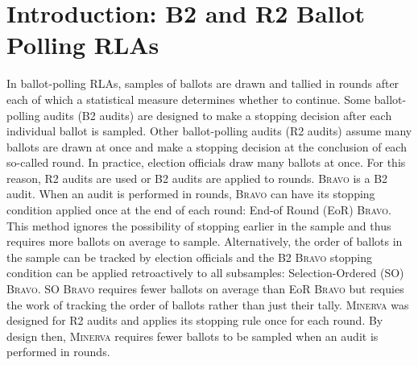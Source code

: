 \documentclass[runningheads]{llncs}
\newcommand{\Minerva}{\textsc{Minerva}\xspace}
\newcommand{\BRAVO}{\textsc{Bravo}\xspace}
\begin{document}
\section{Introduction: B2 and R2 Ballot Polling RLAs}
In ballot-polling RLAs, samples of ballots are drawn and tallied
in rounds
after each of which a statistical measure determines whether to
continue. 
Some ballot-polling audits (B2 audits) 
are designed to make a stopping decision
after each individual ballot is sampled.
Other ballot-polling audits (R2 audits) assume many ballots are drawn
at once and make a stopping decision at the conclusion of each 
so-called round.
In practice, election officials draw many ballots at once.
For this reason, R2 audits are used or B2 audits are applied to 
rounds.
\BRAVO is a B2 audit. 
When an audit is performed in rounds, \BRAVO can have its
stopping condition applied once at the end of each round: End-of Round (EoR) \BRAVO.
This method ignores the possibility of stopping earlier in the 
sample and thus requires more ballots on average to sample.
Alternatively, the order of ballots in the sample can be tracked
by election officials and the B2 \BRAVO stopping condition can 
be applied retroactively to all subsamples: Selection-Ordered (SO) \BRAVO.
SO \BRAVO requires fewer ballots on average than EoR \BRAVO but
requies the work of tracking the order of ballots rather than
just their tally.
\Minerva was designed for R2 audits and applies its stopping rule
once for each round.
By design then, \Minerva requires fewer ballots to be sampled when 
an audit is performed in rounds.
\end{document}
